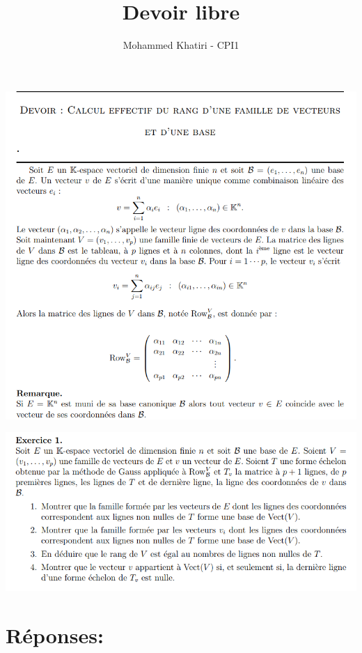 \documentclass{article}
\title{Devoir libre}
\author{Mohammed Khatiri - CPI1}
\begin{document}
\maketitle

\begin{center}
    \includegraphics[scale=0.7]{exo.png}
\end{center}

\newpage

\includegraphics[scale=1]{questions.png}

\section*{Réponses:}
\end{document}
